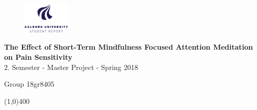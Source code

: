 \clearpage
\thispagestyle{empty}

\begin{figure}[H]
	\raggedleft
	\includegraphics[width=0.2\textwidth]{setup/aau_logo_en.pdf}
\end{figure} 

\vspace{5 cm}

\begin{center}	
	\begin{Huge}
		\textbf{The Effect of Short-Term Mindfulness Focused Attention Meditation on Pain Sensitivity}\\
		\vspace{5 mm}
		$2.$ Semester - Master Project - Spring 2018\\
		\vspace{3 mm}
	\end{Huge}
	{\Large Group 18gr8405}
\end{center}
\vspace*{\fill}

\begin{center}
	\line(1,0){400}
\end{center}




